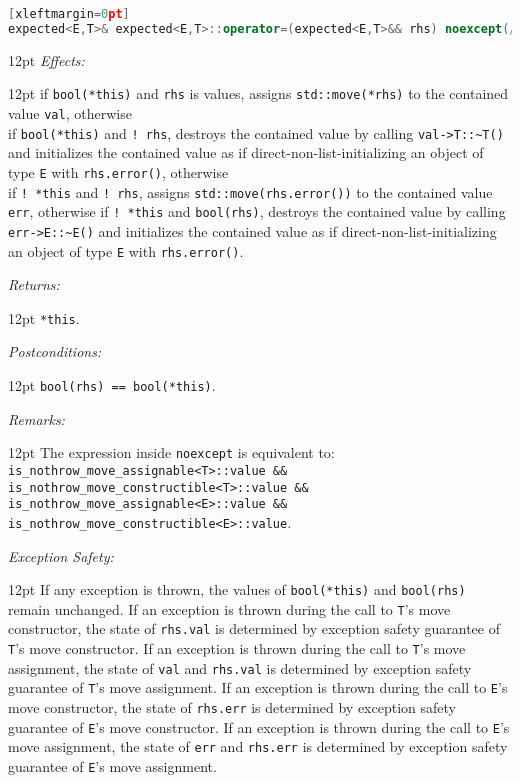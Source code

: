 \documentclass[a4paper,10pt]{article}
\newcommand{\cpp}[1]{\lstinline{#1}}
\newcommand{\wordingItem}[1]{\noindent\textit{#1:}}
\newenvironment{wordingTextItem}[1]{\wordingItem{#1}\vspace{2pt}\noindent\begin{adjustwidth}{12pt}{}}{\vspace{2pt}\end{adjustwidth}}
\newenvironment{wordingPara}{\begin{adjustwidth}{12pt}{}}{\end{adjustwidth}}
\begin{document}
\begin{lstlisting}[language=C++][xleftmargin=0pt]
expected<E,T>& expected<E,T>::operator=(expected<E,T>&& rhs) noexcept(/*see below*/); 
\end{lstlisting}
\begin{wordingPara}
\begin{wordingTextItem}{Effects}
if \cpp{bool(*this)} and \cpp{rhs} is values, assigns \cpp{std::move(*rhs)} to the contained value \cpp{val}, otherwise \\
if \cpp{bool(*this)} and \cpp{! rhs}, destroys the contained value by calling \cpp{val->T::~T()} and  initializes the contained value as if direct-non-list-initializing an object of type \cpp{E} with \cpp{rhs.error()}, otherwise \\
if \cpp{! *this} and \cpp{! rhs}, assigns \cpp{std::move(rhs.error())} to the contained value \cpp{err}, otherwise  
if \cpp{! *this} and \cpp{bool(rhs)}, destroys the contained value by calling \cpp{err->E::~E()} and  initializes the contained value as if direct-non-list-initializing an object of type \cpp{E} with \cpp{rhs.error()}.
\end{wordingTextItem}
\begin{wordingTextItem}{Returns}
\cpp{*this}.
\end{wordingTextItem}
\begin{wordingTextItem}{Postconditions}
\cpp{bool(rhs) == bool(*this)}.
\end{wordingTextItem}
\begin{wordingTextItem}{Remarks}
The expression inside \cpp{noexcept} is equivalent to:\\
\cpp{is_nothrow_move_assignable<T>::value &&}\\
\cpp{is_nothrow_move_constructible<T>::value &&}\\
\cpp{is_nothrow_move_assignable<E>::value &&}\\
\cpp{is_nothrow_move_constructible<E>::value}.
\end{wordingTextItem}
\begin{wordingTextItem}{Exception Safety}
If any exception is thrown, the values of  \cpp{bool(*this)} and \cpp{bool(rhs)} remain unchanged. If an exception is thrown during the call to \cpp{T}'s move constructor, the state of \cpp{rhs.val} is determined by exception safety guarantee of \cpp{T}'s move constructor. If an exception is thrown during the call to \cpp{T}'s move assignment, the state of \cpp{val} and \cpp{rhs.val} is determined by exception safety guarantee of \cpp{T}'s move assignment. If an exception is thrown during the call to \cpp{E}'s move constructor, the state of \cpp{rhs.err} is determined by exception safety guarantee of \cpp{E}'s move constructor. If an exception is thrown during the call to \cpp{E}'s move assignment, the state of \cpp{err} and \cpp{rhs.err} is determined by exception safety guarantee of \cpp{E}'s move assignment.

\end{wordingTextItem}
\end{wordingPara}
\end{document}
